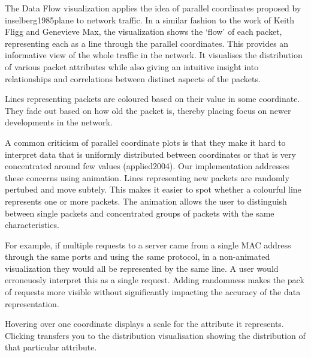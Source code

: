 The Data Flow visualization applies the idea of parallel coordinates proposed by inselberg1985plane to network traffic. In a similar fashion to the work of Keith Fligg and Genevieve Max, the visualization shows the `flow' of each packet, representing each as a line through the parallel coordinates. This provides an informative view of the whole traffic in the network. It visualises the distribution of various packet attributes while also giving an intuitive insight into relationships and correlations between distinct aspects of the packets.

Lines representing packets are coloured based on their value in some coordinate. They fade out based on how old the packet is, thereby placing focus on newer developments in the network. 

A common criticism of parallel coordinate plots is that they make it hard to interpret data that is uniformly distributed between coordinates or that is very concentrated around few values (applied2004). Our implementation addresses these concerns using animation. Lines representing new packets are randomly pertubed and move subtely. This makes it easier to spot whether a colourful line represents one or more packets. The animation allows the user to distinguish between single packets and concentrated groups of packets with the same characteristics.

For example, if multiple requests to a server came from a single MAC address through the same ports and using the same protocol, in a non-animated visualization they would all be represented by the same line. A user would erroneuosly interpret this as a single request. Adding randomness makes the pack of requests more visible without significantly impacting the accuracy of the data representation.

Hovering over one coordinate displays a scale for the attribute it represents. Clicking transfers you to the distribution visualisation showing the distribution of that particular attribute.
